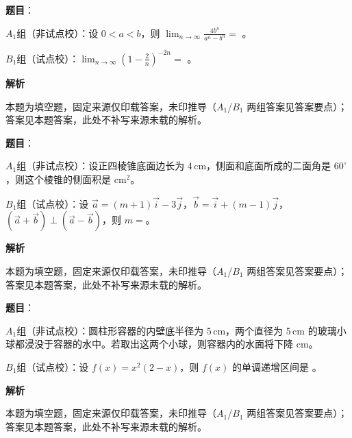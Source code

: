 \begin{answer}

\textbf{题目}：

$A_1$组（非试点校）：设 $0<a<b$，则 $\displaystyle\lim_{n\to\infty}\frac{4b^n}{a^n-b^n}=$ \gkblank{}。

$B_1$组（试点校）：$\displaystyle\lim_{n\to\infty}\left(1-\frac2n\right)^{-2n}=$ \gkblank{}。

\textbf{解析}

本题为填空题，固定来源仅印载答案，未印推导（$A_1$/$B_1$ 两组答案见答案要点）；答案见本题答案，此处不补写来源未载的解析。


\end{answer}
\begin{answer}

\textbf{题目}：

$A_1$组（非试点校）：设正四棱锥底面边长为 $4\,\mathrm{cm}$，侧面和底面所成的二面角是 $60^\circ$，则这个棱锥的侧面积是 \gkblank{} $\mathrm{cm}^2$。

$B_1$组（试点校）：设 $\vec a=(m+1)\vec i-3\vec j$，$\vec b=\vec i+(m-1)\vec j$，$(\vec a+\vec b)\perp(\vec a-\vec b)$，则 $m=$\gkblank{}。

\textbf{解析}

本题为填空题，固定来源仅印载答案，未印推导（$A_1$/$B_1$ 两组答案见答案要点）；答案见本题答案，此处不补写来源未载的解析。


\end{answer}
\begin{answer}

\textbf{题目}：

$A_1$组（非试点校）：圆柱形容器的内壁底半径为 $5\,\mathrm{cm}$，两个直径为 $5\,\mathrm{cm}$ 的玻璃小球都浸没于容器的水中。若取出这两个小球，则容器内的水面将下降 \gkblank{} $\mathrm{cm}$。

$B_1$组（试点校）：设 $f(x)=x^2(2-x)$，则 $f(x)$ 的单调递增区间是 \gkblank{}。

\textbf{解析}

本题为填空题，固定来源仅印载答案，未印推导（$A_1$/$B_1$ 两组答案见答案要点）；答案见本题答案，此处不补写来源未载的解析。


\end{answer}
